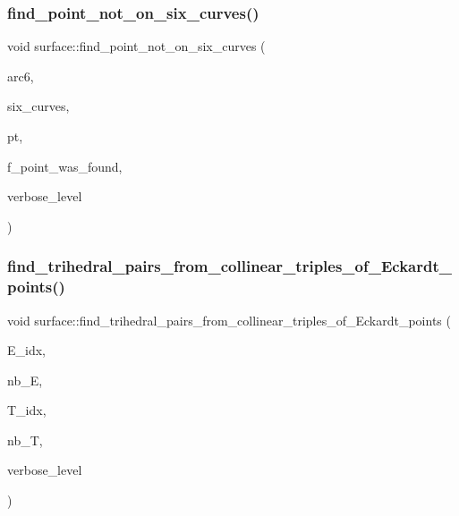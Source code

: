 \subsubsection{\texorpdfstring{find\+\_\+point\+\_\+not\+\_\+on\+\_\+six\+\_\+curves()}{find\_point\_not\_on\_six\_curves()}}
{\footnotesize\ttfamily void surface\+::find\+\_\+point\+\_\+not\+\_\+on\+\_\+six\+\_\+curves (\begin{DoxyParamCaption}\item[{\mbox{\hyperlink{galois_8h_a09fddde158a3a20bd2dcadb609de11dc}{I\+NT}} $\ast$}]{arc6,  }\item[{\mbox{\hyperlink{galois_8h_a09fddde158a3a20bd2dcadb609de11dc}{I\+NT}} $\ast$}]{six\+\_\+curves,  }\item[{\mbox{\hyperlink{galois_8h_a09fddde158a3a20bd2dcadb609de11dc}{I\+NT}} \&}]{pt,  }\item[{\mbox{\hyperlink{galois_8h_a09fddde158a3a20bd2dcadb609de11dc}{I\+NT}} \&}]{f\+\_\+point\+\_\+was\+\_\+found,  }\item[{\mbox{\hyperlink{galois_8h_a09fddde158a3a20bd2dcadb609de11dc}{I\+NT}}}]{verbose\+\_\+level }\end{DoxyParamCaption})}

\mbox{\label{classsurface_ae321c6ed8608a8e87d579fe1f5689f35}} 
\subsubsection{\texorpdfstring{find\+\_\+trihedral\+\_\+pairs\+\_\+from\+\_\+collinear\+\_\+triples\+\_\+of\+\_\+\+Eckardt\+\_\+points()}{find\_trihedral\_pairs\_from\_collinear\_triples\_of\_Eckardt\_points()}}
{\footnotesize\ttfamily void surface\+::find\+\_\+trihedral\+\_\+pairs\+\_\+from\+\_\+collinear\+\_\+triples\+\_\+of\+\_\+\+Eckardt\+\_\+points (\begin{DoxyParamCaption}\item[{\mbox{\hyperlink{galois_8h_a09fddde158a3a20bd2dcadb609de11dc}{I\+NT}} $\ast$}]{E\+\_\+idx,  }\item[{\mbox{\hyperlink{galois_8h_a09fddde158a3a20bd2dcadb609de11dc}{I\+NT}}}]{nb\+\_\+E,  }\item[{\mbox{\hyperlink{galois_8h_a09fddde158a3a20bd2dcadb609de11dc}{I\+NT}} $\ast$\&}]{T\+\_\+idx,  }\item[{\mbox{\hyperlink{galois_8h_a09fddde158a3a20bd2dcadb609de11dc}{I\+NT}} \&}]{nb\+\_\+T,  }\item[{\mbox{\hyperlink{galois_8h_a09fddde158a3a20bd2dcadb609de11dc}{I\+NT}}}]{verbose\+\_\+level }\end{DoxyParamCaption})}

